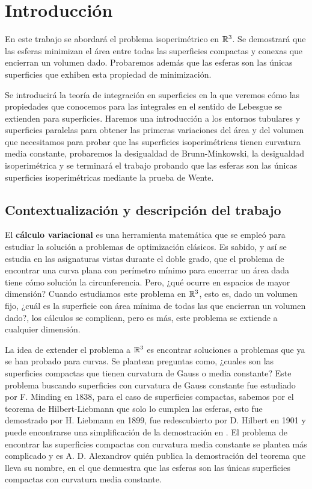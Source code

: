 \section{Introducción}

En este trabajo se abordará el problema isoperimétrico en $\mathbb{R}^3$. Se demostrará que las esferas minimizan el área entre todas las superficies compactas y conexas que encierran un volumen dado. Probaremos además que las esferas son las únicas superficies que exhiben esta propiedad de minimización.

Se introducirá la teoría de integración en superficies en la que veremos cómo las propiedades que conocemos para las integrales en el sentido de Lebesgue se extienden para superficies. Haremos una introducción a los entornos tubulares y superficies paralelas para obtener las primeras variaciones del área y del volumen que necesitamos para probar que las superficies isoperimétricas tienen curvatura media constante, probaremos la desigualdad de Brunn-Minkowski, la desigualdad isoperimétrica y se terminará el trabajo probando que las esferas son las únicas superficies isoperimétricas mediante la prueba de Wente.

\subsection{Contextualización y descripción del trabajo}

El \textbf{cálculo variacional} es una herramienta matemática que se empleó para estudiar la solución a problemas de optimización clásicos. Es sabido, y así se estudia en las asignaturas vistas durante el doble grado, que el problema de encontrar una curva plana con perímetro mínimo para encerrar un área dada tiene cómo solución la circunferencia. Pero, ¿qué ocurre en espacios de mayor dimensión? Cuando estudiamos este problema en $\mathbb{R}^3$, esto es, dado un volumen fijo, ¿cuál es la superficie con área mínima de todas las que encierran un volumen dado?, los cálculos se complican, pero es más, este problema se extiende a cualquier dimensión.

La idea de extender el problema a $\mathbb{R}^3$ es encontrar soluciones a problemas que ya se han probado para curvas. Se plantean preguntas como, ¿cuales son las superficies compactas que tienen curvatura de Gauss o media constante? Este problema buscando superficies con curvatura de Gauss constante fue estudiado por F. Minding en 1838, para el caso de superficies compactas, sabemos por el teorema de Hilbert-Liebmann que solo lo cumplen las esferas, esto fue demostrado por H. Liebmann en 1899, fue redescubierto por D. Hilbert en 1901 y puede encontrarse una simplificación de la demostración en \cite{montielrosbook}. El problema de encontrar las superficies compactas con curvatura media constante se plantea más complicado y es A. D. Alexandrov quién publica la demostración del teorema que lleva su nombre, en el que demuestra que las esferas son las únicas superficies compactas con curvatura media constante.

